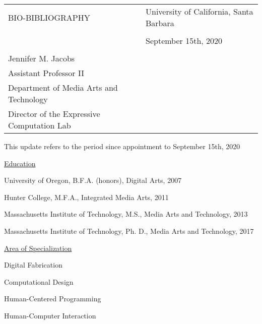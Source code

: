 \documentclass[10pt]{article}
\begin{document}
\noindent
\begin{tabularx}{\linewidth}{XX} 
BIO-BIBLIOGRAPHY & \hfill University of California, Santa Barbara \\ \\
 & \hfill September 15th, 2020 \\ \\
 Jennifer M. Jacobs &   \\ 
 Assistant Professor II & \\
 Department of Media Arts and Technology & \\
 Director of the Expressive Computation Lab & 
 \end{tabularx}

\vspace{1cm}

This update refers to the period since appointment %
to September 15th, 2020


\vspace{1cm}

\raggedright

\vspace{0.5cm}
\underline{Education}

University of Oregon, B.F.A. (honors), Digital Arts, 2007

Hunter College, M.F.A., Integrated Media Arts, 2011

Massachusetts Institute of Technology, M.S., Media Arts and Technology, 2013

Massachusetts Institute of Technology, Ph. D., Media Arts and Technology, 2017


\vspace{0.5cm}
\underline{Area of Specialization}

Digital Fabrication

Computational Design

Human-Centered Programming

Human-Computer Interaction
\end{document}
